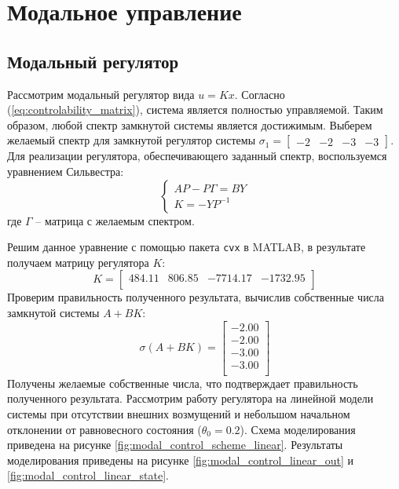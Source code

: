 \section{Модальное управление}
\subsection{Модальный регулятор}
Рассмотрим модальный регулятор вида $u = Kx$. Согласно (\ref{eq:controlability_matrix}), система является 
полностью управляемой. Таким образом, любой спектр замкнутой системы является достижимым. 
Выберем желаемый спектр для замкнутой регулятор системы $\sigma_1 = \begin{bmatrix}-2 & -2 & -3 & -3\end{bmatrix}$. 
Для реализации регулятора, обеспечивающего заданный спектр, воспользуемся уравнением Сильвестра: 
\begin{equation}
    \begin{cases}
        AP - P\Gamma = BY \\
        K = -YP^{-1} 
    \end{cases}
\end{equation}
где $\Gamma$ -- матрица с желаемым спектром. 

Решим данное уравнение с помощью пакета \texttt{cvx} в MATLAB, в результате получаем матрицу регулятора $K$:
\begin{equation}
    K = \begin{bmatrix}
    484.11  & 806.85  & -7714.17  & -1732.95 \\ 
    \end{bmatrix}
\end{equation} 
Проверим правильность полученного результата, вычислив собственные числа замкнутой системы $A + BK$: 
\begin{equation}
    \sigma(A + BK) = \begin{bmatrix}
    -2.00 \\ 
    -2.00 \\ 
    -3.00 \\ 
    -3.00 \\ 
    \end{bmatrix}
\end{equation}
Получены желаемые собственные числа, что подтверждает правильность полученного результата. 
Рассмотрим работу регулятора на линейной модели системы при отсутствии внешних возмущений и 
небольшом начальном отклонении от равновесного состояния ($\theta_0 = 0.2$). Схема моделирования приведена на 
рисунке \ref{fig:modal_control_scheme_linear}. Результаты моделирования приведены на 
рисунке \ref{fig:modal_control_linear_out} и \ref{fig:modal_control_linear_state}.

